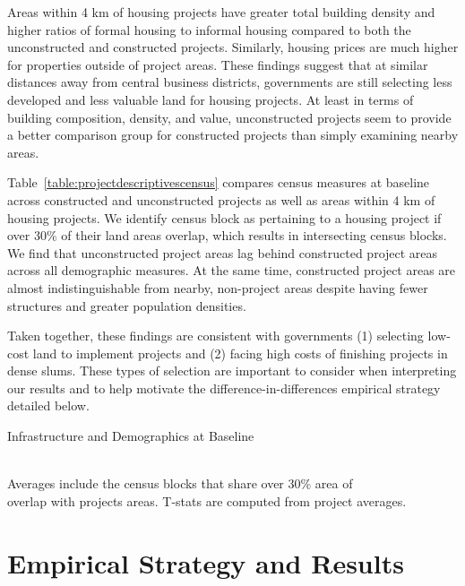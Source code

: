 \documentclass[12pt]{article}
\begin{document}
Areas within 4 km of housing projects have greater total building density and higher ratios of  formal housing to informal housing compared to both the unconstructed and constructed projects.  Similarly, housing prices are much higher for properties outside of project areas.  These findings suggest that at similar distances away from central business districts, governments are still selecting less developed and less valuable land for housing projects.  At least in terms of building composition, density, and value, unconstructed projects seem to provide a better comparison group for constructed projects than simply examining nearby areas.  

Table~\ref{table:projectdescriptivescensus} compares census measures at baseline across constructed and unconstructed projects as well as areas within 4 km of housing projects.  We identify census block as pertaining to a housing project if over 30\% of their land areas overlap, which results in intersecting census blocks.  We find that unconstructed project areas lag behind constructed project areas across all demographic measures.  At the same time, constructed project areas are almost indistinguishable from nearby, non-project areas despite having fewer structures and greater population densities.

Taken together, these findings are consistent with governments (1) selecting low-cost land to implement projects and (2) facing high costs of finishing projects in dense slums.  These types of selection are important to consider when interpreting our results and to help motivate the difference-in-differences empirical strategy detailed below.

\begin{table}
	\centering
	\caption{Infrastructure and Demographics at Baseline}\label{table:projectdescriptivescensus}
%
 \\
\vspace{.2cm}
\footnotesize{Averages include the census blocks that share over 30\% area of \\ overlap with projects areas.  T-stats are computed from project averages.}
\end{table}

\section{Empirical Strategy and Results}\label{section:results}
\end{document}
